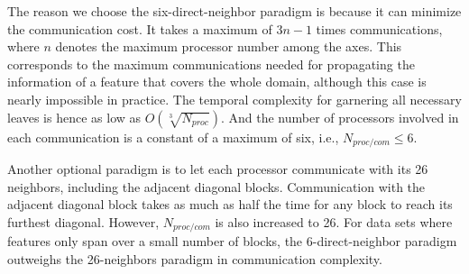 The reason we choose the six-direct-neighbor paradigm is because it can minimize the communication cost. It takes a maximum of ${3n-1}$ times communications, where $n$ denotes the maximum processor number among the axes. This corresponds to the maximum communications needed for propagating the information of a feature that covers the whole domain, although this case is nearly impossible in practice. The temporal complexity for garnering all necessary leaves is hence as low as ${O(\sqrt[3]{N_{proc}})}$. And the number of processors involved in each communication is a constant of a maximum of six, i.e., $N_{proc/com} \leq 6$.

Another optional paradigm is to let each processor communicate with its 26 neighbors, including the adjacent diagonal blocks. Communication with the adjacent diagonal block takes as much as half the time for any block to reach its furthest diagonal. However, $N_{proc/com}$  is also increased to 26. For data sets where features only span over a small number of blocks, the 6-direct-neighbor paradigm outweighs the 26-neighbors paradigm in communication complexity.

%
% 		
% 		

